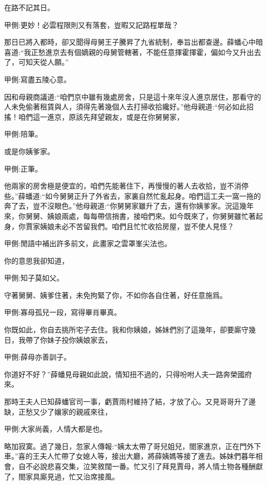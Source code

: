 \begin{parag}
    在路不記其日。\begin{note}甲側:更妙！必雲程限則又有落套，豈暇又記路程單哉？\end{note}那日已將入都時，卻又聞得母舅王子騰昇了九省統制，奉旨出都查邊。薛蟠心中暗喜道:“我正愁進京去有個嫡親的母舅管轄著，不能任意揮霍揮霍，偏如今又升出去了，可知天從人願。”\begin{note}甲側:寫盡五陵心意。\end{note}因和母親商議道:“咱們京中雖有幾處房舍，只是這十來年沒人進京居住，那看守的人未免偷著租賃與人，須得先著幾個人去打掃收拾纔好。”他母親道:“何必如此招搖！咱們這一進京，原該先拜望親友，或是在你舅舅家，\begin{note}甲側:陪筆。\end{note}或是你姨爹家。\begin{note}甲側:正筆。\end{note}他兩家的房舍極是便宜的，咱們先能著住下，再慢慢的著人去收拾，豈不消停些。”薛蟠道:“如今舅舅正升了外省去，家裏自然忙亂起身。咱們這工夫一窩一拖的奔了去，豈不沒眼色。”他母親道:“你舅舅家雖升了去，還有你姨爹家。況這幾年來，你舅舅、姨娘兩處，每每帶信捎書，接咱們來。如今既來了，你舅舅雖忙著起身，你賈家姨娘未必不苦留我們。咱們且忙忙收拾房屋，豈不使人見怪？\begin{note}甲側:閒語中補出許多前文，此畫家之雲罩峯尖法也。\end{note}你的意思我卻知道，\begin{note}甲側:知子莫如父。\end{note}守著舅舅、姨爹住著，未免拘緊了你，不如你各自住著，好任意施爲。\begin{note}甲側:寡母孤兒一段，寫得畢肖畢真。\end{note}你既如此，你自去挑所宅子去住。我和你姨娘，姊妹們別了這幾年，卻要廝守幾日，我帶了你妹子投你姨娘家去，\begin{note}甲側:薛母亦善訓子。\end{note}你道好不好？”薛蟠見母親如此說，情知扭不過的，只得吩咐人夫一路奔榮國府來。
\end{parag}


\begin{parag}
    那時王夫人已知薛蟠官司一事，虧賈雨村維持了結，才放了心。又見哥哥升了邊缺，正愁又少了孃家的親戚來往，\begin{note}甲側:大家尚義，人情大都是也。\end{note}略加寂寞。過了幾日，忽家人傳報:“姨太太帶了哥兒姐兒，閤家進京，正在門外下車。”喜的王夫人忙帶了女媳人等，接出大廳，將薛姨媽等接了進去。姊妹們暮年相會，自不必說悲喜交集，泣笑敘闊一番。忙又引了拜見賈母，將人情土物各種酬獻了，閤家具廝見過，忙又治席接風。
\end{parag}


